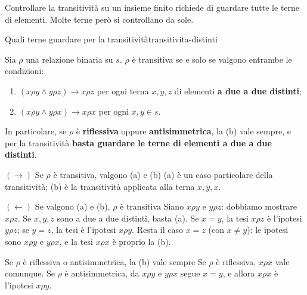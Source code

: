 Controllare la transitività su un insieme finito richiede di guardare tutte le terne di elementi. Molte terne però si
controllano da sole.

\begin{concetto}
\begin{Proposizione}{Quali terne guardare per la transitività}{transitivita-distinti}
    \begin{prerequisiti}
    \end{prerequisiti}
    Sia $\rho$ una relazione binaria su $s$. $\rho$ è transitiva se e solo se valgono entrambe le condizioni:
    \begin{enumerate}
        \item[(a)] $(x \rho y \wedge y \rho z) \rightarrow x \rho z$ per ogni terna $x, y, z$ di elementi \textbf{a due a due distinti};
        \item[(b)] $(x \rho y \wedge y \rho x) \rightarrow x \rho x$ per ogni $x, y \in s$.
    \end{enumerate}
    In particolare, se $\rho$ è \textbf{riflessiva} oppure \textbf{antisimmetrica}, la (b) vale sempre, e per la transitività
    \textbf{basta guardare le terne di elementi a due a due distinti}.
\end{Proposizione}
\begin{dimostrazione}
    \begin{caso}{$(\rightarrow)$ Se $\rho$ è transitiva, valgono (a) e (b)}
        (a) è un caso particolare della transitività; (b) è la transitività applicata alla terna $x, y, x$.
    \end{caso}
    \begin{caso}{$(\leftarrow)$ Se valgono (a) e (b), $\rho$ è transitiva}
        Siano $x \rho y$ e $y \rho z$: dobbiamo mostrare $x \rho z$.
        Se $x, y, z$ sono a due a due distinti, basta (a). Se $x = y$, la tesi $x \rho z$ è l'ipotesi $y \rho z$; se $y = z$,
        la tesi è l'ipotesi $x \rho y$. Resta il caso $x = z$ (con $x \neq y$): le ipotesi sono $x \rho y$ e $y \rho x$, e
        la tesi $x \rho x$ è proprio la (b).
    \end{caso}
    \begin{caso}{Se $\rho$ è riflessiva o antisimmetrica, la (b) vale sempre}
        Se $\rho$ è riflessiva, $x \rho x$ vale comunque. Se $\rho$ è antisimmetrica, da $x \rho y$ e $y \rho x$ segue $x = y$,
        e allora $x \rho x$ è l'ipotesi $x \rho y$.
    \end{caso}
\end{dimostrazione}
\end{concetto}


